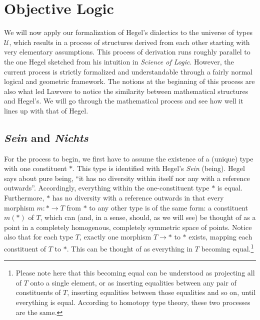 \documentclass{article}
\begin{document}
\section{Objective Logic}
We will now apply our formalization of Hegel's dialectics to the universe of types $\mathcal{U}$, which
results in a process of structures derived from each other starting with very elementary assumptions. This
process of derivation runs roughly parallel to the one Hegel sketched from his intuition in \emph{Science of
Logic}. However, the current process is strictly formalized and understandable through a fairly normal
logical and geometric framework. The notions at the beginning of this process are also what led Lawvere to
notice the similarity between mathematical structures and Hegel's. We will go through the mathematical
process and see how well it lines up with that of Hegel.


\subsection{\emph{Sein} and \emph{Nichts}}
For the process to begin, we first have to assume the existence of a (unique) type with one constituent $*$.
This type is identified with Hegel's \emph{Sein} (being). Hegel says about pure being, ``it has no diversity
within itself nor any with a reference outwards''. Accordingly, everything within the one-constituent type
$*$ is equal. Furthermore, $*$ has no diversity with a reference outwards in that every morphism
$m:*\rightarrow T$ from $*$ to any other type is of the same form: a constituent $m(*)$ of $T$, which can
(and, in a sense, should, as we will see) be thought of as a point in a completely homogenous, completely
symmetric space of points. Notice also that for each type $T$, exactly one morphism $T\rightarrow *$ to $*$
exists, mapping each constituent of $T$ to $*$. This can be thought of as everything in $T$ becoming
equal.\footnote{Please note here that this becoming equal can be understood as projecting all of $T$ onto a 
single element, or as inserting equalities between any pair of constituents of $T$, inserting equalities 
between those equalities and so on, until everything is equal. According to homotopy type theory, these two 
processes are the same.} \\ 
\end{document}
